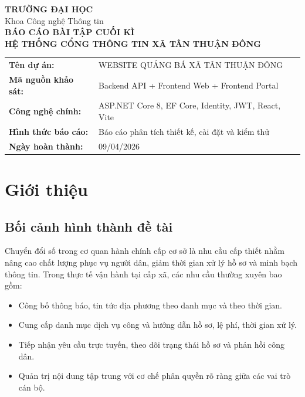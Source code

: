 \documentclass[12pt,a4paper]{article}
\begin{document}
\begin{titlepage}
  \centering
  \vspace*{1.4cm}
  {\Large \textbf{TRƯỜNG ĐẠI HỌC}}\\[0.2cm]
  {\large Khoa Công nghệ Thông tin}\\[1.2cm]

  {\LARGE \textbf{BÁO CÁO BÀI TẬP CUỐI KÌ}}\\[0.5cm]
  {\LARGE \textbf{HỆ THỐNG CỔNG THÔNG TIN XÃ TÂN THUẬN ĐÔNG}}\\[1.0cm]

  \begin{tabular}{>{\bfseries}p{5cm}p{8.8cm}}
    Tên dự án: & WEBSITE QUẢNG BÁ XÃ TÂN THUẬN ĐÔNG \\
    Mã nguồn khảo sát: & Backend API + Frontend Web + Frontend Portal \\
    Công nghệ chính: & ASP.NET Core 8, EF Core, Identity, JWT, React, Vite \\
    Hình thức báo cáo: & Báo cáo phân tích thiết kế, cài đặt và kiểm thử \\
    Ngày hoàn thành: & 09/04/2026 \\
  \end{tabular}

\end{titlepage}

\tableofcontents
\newpage
{}
\listoffigures
\newpage

\section{Giới thiệu}

\subsection{Bối cảnh hình thành đề tài}
Chuyển đổi số trong cơ quan hành chính cấp cơ sở là nhu cầu cấp thiết nhằm nâng cao chất lượng phục vụ người dân, giảm thời gian xử lý hồ sơ và minh bạch thông tin. Trong thực tế vận hành tại cấp xã, các nhu cầu thường xuyên bao gồm:
\begin{itemize}[leftmargin=1.1cm]
  \item Công bố thông báo, tin tức địa phương theo danh mục và theo thời gian.
  \item Cung cấp danh mục dịch vụ công và hướng dẫn hồ sơ, lệ phí, thời gian xử lý.
  \item Tiếp nhận yêu cầu trực tuyến, theo dõi trạng thái hồ sơ và phản hồi công dân.
  \item Quản trị nội dung tập trung với cơ chế phân quyền rõ ràng giữa các vai trò cán bộ.
\end{itemize}
\end{document}
